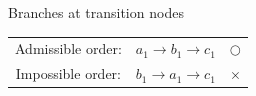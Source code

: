 \documentclass[8pt]{beamer}
\begin{document}
%    

%
%
%
%
%
\begin{frame}{Branches at transition nodes}
\begin{figure}

\end{figure}
\begin{figure}

\end{figure}
\begin{table}[t]
    \centering
    \begin{tabular}{ccc}
        Admissible order:& $a_1\to b_1\to c_1$ &$\bigcirc$\\
        Impossible order:& $b_1\to a_1\to c_1$ &$\times$
    \end{tabular}
\end{table}

\end{frame}
\end{document}
